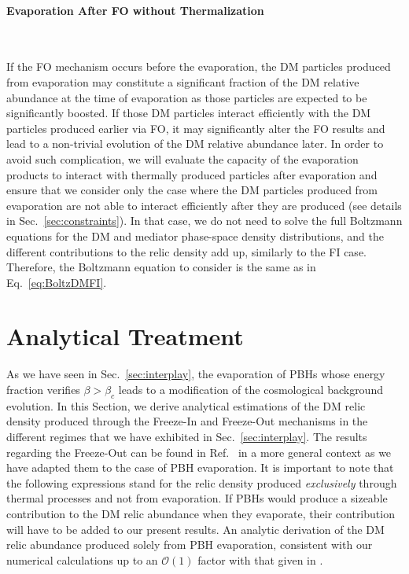 \documentclass[aps,prd,reprint,twocolumn,preprintnumbers,floatfix,nofootinbib]{revtex4-1}
\newcommand{\secref}[1]{Sec.~\ref{#1}}
\begin{document}
\paragraph{Evaporation After FO without Thermalization}~\newline

If the FO mechanism occurs before the evaporation, the DM particles produced from evaporation may constitute a significant fraction of the DM relative abundance at the time of evaporation as those particles are expected to be significantly boosted. If those DM particles interact efficiently with the DM particles produced earlier via FO, it may significantly alter the FO results and lead to a non-trivial evolution of the DM relative abundance later. In order to avoid such complication, we will evaluate the capacity of the evaporation products to interact with thermally produced particles after evaporation and ensure that we consider only the case where the DM particles produced from evaporation are not able to interact efficiently after they are produced (see details in \secref{sec:constraints}). In that case, we do not need to solve the full Boltzmann equations for the DM and mediator phase-space density distributions, and the different contributions to the relic density add up, similarly to the FI case. Therefore, the Boltzmann equation to consider is the same as in Eq.~\eqref{eq:BoltzDMFI}.

\section{Analytical Treatment}\label{sec:analytic}
As we have seen in \secref{sec:interplay}, the evaporation of PBHs whose energy fraction verifies $\beta>\beta_c$ leads to a modification of the cosmological background evolution. In this Section, we derive analytical estimations of the DM relic density produced through the Freeze-In and Freeze-Out mechanisms in the different regimes that we have exhibited in \secref{sec:interplay}.  The results regarding the Freeze-Out can be found in Ref.~\cite{Arias:2019uol} in a more general context as we have adapted them to the case of PBH evaporation. It is important to note that the following expressions stand for the relic density produced {\em exclusively} through thermal processes and not from evaporation. If PBHs would produce a sizeable contribution to the DM relic abundance when they evaporate, their contribution will have to be added to our present results. An analytic derivation of the DM relic abundance produced solely from PBH evaporation, consistent with our numerical calculations up to an $\mathcal{O}(1)$ factor with that  given in \cite{paper1}.
\end{document}
